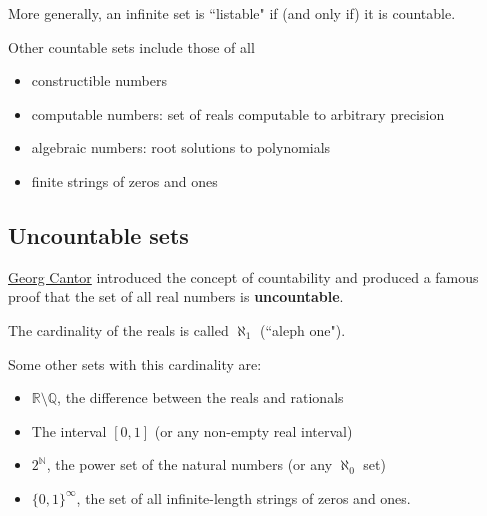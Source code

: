\documentclass{article}[12pt]
\newcommand{\N}{\mathbb{N}}
\newcommand{\Q}{\mathbb{Q}}
\newcommand{\R}{\mathbb{R}}
\begin{document}
            More generally, an infinite set is ``listable" if (and only if) it is countable.
            
            Other countable sets include those of all
            \begin{itemize}
                \item
                constructible numbers
                
                \item
                computable numbers: set of reals computable to arbitrary precision
                
                \item
                algebraic numbers: root solutions to polynomials
                
                \item
                finite strings of zeros and ones
                
            \end{itemize}
                
            
            
        \subsection{Uncountable sets}
            \href{https://www.youtube.com/watch?v=elvOZm0d4H0}{Georg Cantor} introduced the concept of countability and produced a famous proof that the set of all real numbers is \textbf{uncountable}.
            
            The cardinality of the reals is called $\aleph_1$ (``aleph one").
            
            Some other sets with this cardinality are:
            
            \begin{itemize}
                \item $\R \setminus \Q$, the difference between the reals and rationals
                
                \item
                The interval $[0, 1]$ (or any non-empty real interval)
                
                \item
                $2^{\N}$, the power set of the natural numbers (or any $\aleph_0$ set)
                
                \item
                $\{0, 1\}^{\infty}$, the set of all infinite-length strings of zeros and ones.
            \end{itemize}
            
\end{document}
